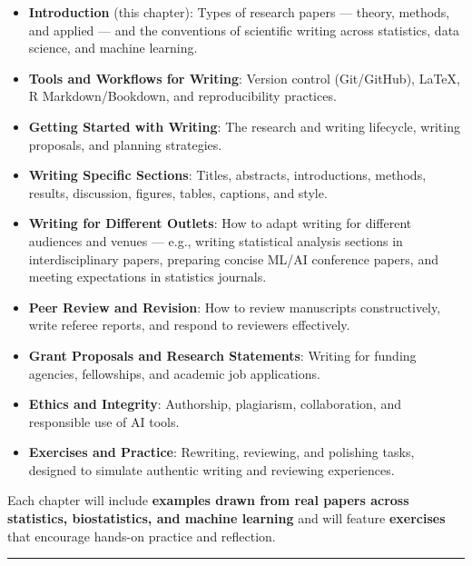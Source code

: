 \documentclass[
]{book}
\providecommand{\tightlist}{%
  \setlength{\itemsep}{0pt}\setlength{\parskip}{0pt}}
\theoremstyle{definition}
\theoremstyle{definition}
\theoremstyle{definition}
\theoremstyle{definition}
\theoremstyle{remark}
\begin{document}
\begin{itemize}
\tightlist
\item
  \textbf{Introduction} (this chapter): Types of research papers --- theory, methods, and applied --- and the conventions of scientific writing across statistics, data science, and machine learning.\\
\item
  \textbf{Tools and Workflows for Writing}: Version control (Git/GitHub), LaTeX, R Markdown/Bookdown, and reproducibility practices.\\
\item
  \textbf{Getting Started with Writing}: The research and writing lifecycle, writing proposals, and planning strategies.\\
\item
  \textbf{Writing Specific Sections}: Titles, abstracts, introductions, methods, results, discussion, figures, tables, captions, and style.\\
\item
  \textbf{Writing for Different Outlets}: How to adapt writing for different audiences and venues --- e.g., writing statistical analysis sections in interdisciplinary papers, preparing concise ML/AI conference papers, and meeting expectations in statistics journals.\\
\item
  \textbf{Peer Review and Revision}: How to review manuscripts constructively, write referee reports, and respond to reviewers effectively.\\
\item
  \textbf{Grant Proposals and Research Statements}: Writing for funding agencies, fellowships, and academic job applications.\\
\item
  \textbf{Ethics and Integrity}: Authorship, plagiarism, collaboration, and responsible use of AI tools.\\
\item
  \textbf{Exercises and Practice}: Rewriting, reviewing, and polishing tasks, designed to simulate authentic writing and reviewing experiences.
\end{itemize}

Each chapter will include \textbf{examples drawn from real papers across statistics, biostatistics, and machine learning} and will feature \textbf{exercises} that encourage hands-on practice and reflection.

\begin{center}\rule{0.5\linewidth}{0.5pt}\end{center}
\end{document}
